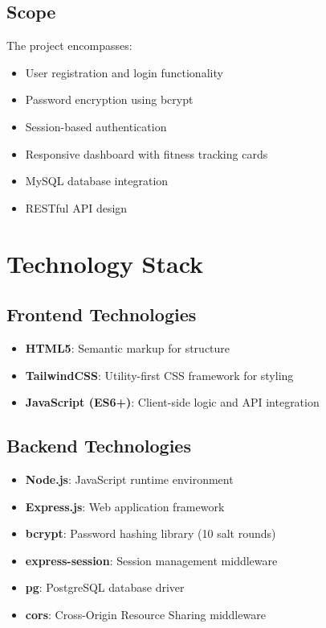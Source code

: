 \documentclass[12pt,a4paper]{article}
\begin{document}
\subsection{Scope}
The project encompasses:
\begin{itemize}
    \item User registration and login functionality
    \item Password encryption using bcrypt
    \item Session-based authentication
    \item Responsive dashboard with fitness tracking cards
    \item MySQL database integration
    \item RESTful API design
\end{itemize}

\section{Technology Stack}

\subsection{Frontend Technologies}
\begin{itemize}
    \item \textbf{HTML5}: Semantic markup for structure
    \item \textbf{TailwindCSS}: Utility-first CSS framework for styling
    \item \textbf{JavaScript (ES6+)}: Client-side logic and API integration
\end{itemize}

\subsection{Backend Technologies}
\begin{itemize}
    \item \textbf{Node.js}: JavaScript runtime environment
    \item \textbf{Express.js}: Web application framework
    \item \textbf{bcrypt}: Password hashing library (10 salt rounds)
    \item \textbf{express-session}: Session management middleware
    \item \textbf{pg}: PostgreSQL database driver
    \item \textbf{cors}: Cross-Origin Resource Sharing middleware
\end{itemize}
\end{document}
